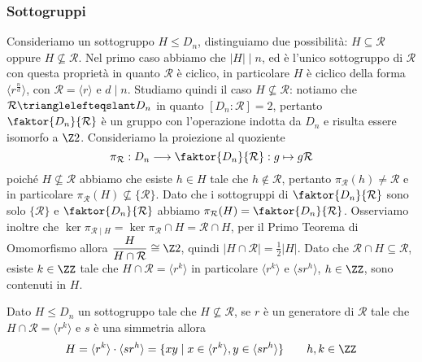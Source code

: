 \documentclass[11pt]{scrartcl}
\begin{document}
\subsubsection{Sottogruppi}

Consideriamo un sottogruppo $H\leqslant D_n$, distinguiamo due possibilità: 
$H \subseteq \mathcal{R}$ oppure $H \nsubseteq \mathcal{R}$. Nel primo caso
abbiamo che $|H|\mid n$, ed è l'unico sottogruppo di $\mathcal{R}$ con questa 
proprietà in quanto $\mathcal{R}$ è ciclico, in particolare $H$ è ciclico 
della forma $\langle r^{\frac n d}\rangle$, con $\mathcal{R} = 
\langle r\rangle$ e $d \mid n$. \newline
Studiamo quindi il caso $H \nsubseteq \mathcal{R}$: notiamo che 
$\mathcal{R}\trianglelefteqslant D_n$ in quanto $[D_n : \mathcal{R}] = 2$,
pertanto $\faktor{D_n}{\mathcal{R}}$ è un gruppo con l'operazione indotta da $D_n$
e risulta essere isomorfo a $\Z2$. \newline
Consideriamo la proiezione al quoziente 
\[
    \pi_{\mathcal{R}}: D_n \longrightarrow \faktor{D_n}{\mathcal{R}} : g \mapsto g\mathcal{R}
\]
poiché $H \nsubseteq \mathcal{R}$ abbiamo che esiste $h \in H$ tale che 
$h \notin \mathcal{R}$, pertanto $\pi_{\mathcal{R}}(h) \neq \mathcal{R}$ e
in particolare $\pi_{\mathcal{R}}(H) \nsubseteq \{\mathcal{R}\}$. Dato che i 
sottogruppi di $\faktor{D_n}{\mathcal{R}}$ sono solo $\{\mathcal{R}\}$ e
$\faktor{D_n}{\mathcal{R}}$ abbiamo $\pi_{\mathcal{R}}(H) = 
\faktor{D_n}{\mathcal{R}}$. Osserviamo inoltre che $\ker \pi_{\mathcal{R}\mid H} = 
\ker \pi_{\mathcal{R}} \cap H = \mathcal{R}\cap H$, per il Primo Teorema di Omomorfismo
allora $\displaystyle\frac{H}{H\cap \mathcal{R}} \cong \Z2$, quindi 
$|H\cap\mathcal{R}| = \displaystyle\frac 1 2 |H|$. Dato che $\mathcal{R}\cap H \subseteq
\mathcal{R}$, esiste $k \in \ZZ$ tale che $H\cap\mathcal{R} = \langle r^k\rangle$
in particolare $\langle r^k\rangle$ e $\langle sr^h\rangle$, $h \in \ZZ$, sono
contenuti in $H$. 

\begin{proposition}
    Dato $H\leqslant D_n$ un sottogruppo tale che $H\nsubseteq \mathcal{R}$, se
    $r$ è un generatore di $\mathcal{R}$ tale che $H\cap\mathcal{R} = \langle r^k\rangle$ 
    e $s$ è una simmetria allora \[
    H = \langle r^k\rangle\cdot\langle sr^h\rangle = \{xy \mid x \in \langle r^k\rangle,
    y \in \langle sr^h\rangle\}\qquad h, k \in \ZZ
    \]
\end{proposition}
\end{document}
